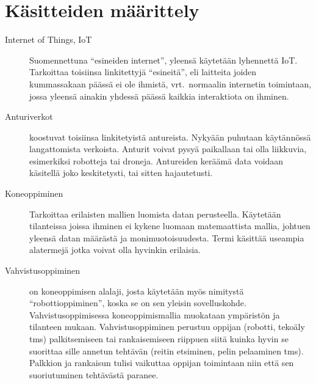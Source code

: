 \section{Käsitteiden määrittely}

\begin{description}

  \item [Internet of Things, IoT]
    Suomennettuna ``esineiden internet'', yleensä
    käytetään lyhennettä IoT. Tarkoittaa toisiinsa linkitettyjä ``esineitä'', eli
    laitteita joiden kummassakaan päässä ei ole ihmistä, vrt.\ normaalin internetin
    toimintaan, jossa yleensä ainakin yhdessä päässä kaikkia interaktiota on
    ihminen.

  \item [Anturiverkot] koostuvat toisiinsa linkitetyistä
    antureista. Nykyään puhutaan käytännössä langattomista verkoista.
    Anturit voivat pysyä paikallaan tai olla liikkuvia, esimerkiksi robotteja
    tai droneja. Antureiden keräämä data voidaan käsitellä joko keskitetysti,
    tai sitten hajautetusti.~\cite{Chong2003,Tubaishat2003}

  \item [Koneoppiminen]
    Tarkoittaa erilaisten mallien luomista datan perusteella. Käytetään
    tilanteissa joissa ihminen ei kykene luomaan matemaattista mallia, johtuen
    yleensä datan määrästä ja monimuotoisuudesta. Termi käsittää useampia
    alatermejä jotka voivat olla hyvinkin erilaisia.

  \item [Vahvistusoppiminen] on koneoppimisen alalaji, josta käytetään myös
    nimitystä ``robottioppiminen'', koska se on sen yleisin sovelluskohde.
    Vahvistusoppimisessa koneoppimismallia muokataan ympäristön ja tilanteen
    mukaan. Vahvistusoppiminen perustuu oppijan (robotti, tekoäly tms)
    palkitsemiseen tai rankaisemiseen riippuen siitä kuinka hyvin se suorittaa
    sille annetun tehtävän (reitin etsiminen, pelin pelaaminen tms). Palkkion
    ja rankaisun tulisi vaikuttaa oppijan toimintaan niin että sen
    suoriutuminen tehtävästä paranee.~\cite{Kaelbling1996}

\end{description}
